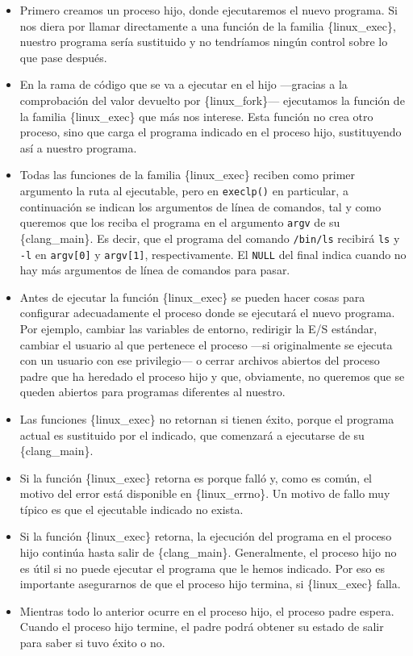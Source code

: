 \begin{itemize}
\item
  Primero creamos un proceso hijo, donde ejecutaremos el nuevo programa.
  Si nos diera por llamar directamente a una función de la familia
  \{linux\_exec\}, nuestro programa sería sustituido y no tendríamos
  ningún control sobre lo que pase después.
\item
  En la rama de código que se va a ejecutar en el hijo ---gracias a la
  comprobación del valor devuelto por \{linux\_fork\}--- ejecutamos la
  función de la familia \{linux\_exec\} que más nos interese. Esta
  función no crea otro proceso, sino que carga el programa indicado en
  el proceso hijo, sustituyendo así a nuestro programa.
\item
  Todas las funciones de la familia \{linux\_exec\} reciben como primer
  argumento la ruta al ejecutable, pero en \texttt{execlp()} en
  particular, a continuación se indican los argumentos de línea de
  comandos, tal y como queremos que los reciba el programa en el
  argumento \texttt{argv} de su \{clang\_main\}. Es decir, que el
  programa del comando \texttt{/bin/ls} recibirá \texttt{ls} y
  \texttt{-l} en \texttt{argv{[}0{]}} y \texttt{argv{[}1{]}},
  respectivamente. El \texttt{NULL} del final indica cuando no hay más
  argumentos de línea de comandos para pasar.
\item
  Antes de ejecutar la función \{linux\_exec\} se pueden hacer cosas
  para configurar adecuadamente el proceso donde se ejecutará el nuevo
  programa. Por ejemplo, cambiar las variables de entorno, redirigir la
  E/S estándar, cambiar el usuario al que pertenece el proceso ---si
  originalmente se ejecuta con un usuario con ese privilegio--- o cerrar
  archivos abiertos del proceso padre que ha heredado el proceso hijo y
  que, obviamente, no queremos que se queden abiertos para programas
  diferentes al nuestro.
\item
  Las funciones \{linux\_exec\} no retornan si tienen éxito, porque el
  programa actual es sustituido por el indicado, que comenzará a
  ejecutarse de su \{clang\_main\}.
\item
  Si la función \{linux\_exec\} retorna es porque falló y, como es
  común, el motivo del error está disponible en \{linux\_errno\}. Un
  motivo de fallo muy típico es que el ejecutable indicado no exista.
\item
  Si la función \{linux\_exec\} retorna, la ejecución del programa en el
  proceso hijo continúa hasta salir de \{clang\_main\}. Generalmente, el
  proceso hijo no es útil si no puede ejecutar el programa que le hemos
  indicado. Por eso es importante asegurarnos de que el proceso hijo
  termina, si \{linux\_exec\} falla.
\item
  Mientras todo lo anterior ocurre en el proceso hijo, el proceso padre
  espera. Cuando el proceso hijo termine, el padre podrá obtener su
  estado de salir para saber si tuvo éxito o no.
\end{itemize}

